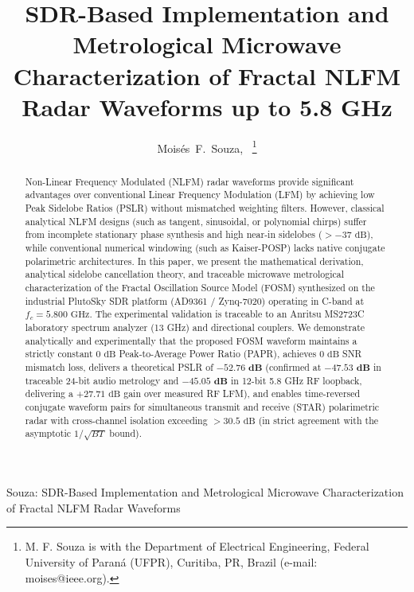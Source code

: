 \documentclass[journal,compsoc]{IEEEtran}
\begin{document}
\title{SDR-Based Implementation and Metrological Microwave Characterization of Fractal NLFM Radar Waveforms up to 5.8 GHz}

\author{Mois\'es~F.~Souza,~%
\thanks{M. F. Souza is with the Department of Electrical Engineering, Federal University of Paran\'a (UFPR), Curitiba, PR, Brazil (e-mail: moises@ieee.org).}}

%
{Souza: SDR-Based Implementation and Metrological Microwave Characterization of Fractal NLFM Radar Waveforms}

\maketitle

\begin{abstract}
Non-Linear Frequency Modulated (NLFM) radar waveforms provide significant advantages over conventional Linear Frequency Modulation (LFM) by achieving low Peak Sidelobe Ratios (PSLR) without mismatched weighting filters. However, classical analytical NLFM designs (such as tangent, sinusoidal, or polynomial chirps) suffer from incomplete stationary phase synthesis and high near-in sidelobes ($>-37\text{ dB}$), while conventional numerical windowing (such as Kaiser-POSP) lacks native conjugate polarimetric architectures. In this paper, we present the mathematical derivation, analytical sidelobe cancellation theory, and traceable microwave metrological characterization of the Fractal Oscillation Source Model (FOSM) synthesized on the industrial PlutoSky SDR platform (AD9361 / Zynq-7020) operating in C-band at $f_c = 5.800\text{ GHz}$. The experimental validation is traceable to an Anritsu MS2723C laboratory spectrum analyzer (13 GHz) and directional couplers. We demonstrate analytically and experimentally that the proposed FOSM waveform maintains a strictly constant $0\text{ dB}$ Peak-to-Average Power Ratio (PAPR), achieves $0\text{ dB}$ SNR mismatch loss, delivers a theoretical PSLR of $\mathbf{-52.76\text{ dB}}$ (confirmed at $\mathbf{-47.53\text{ dB}}$ in traceable 24-bit audio metrology and $\mathbf{-45.05\text{ dB}}$ in 12-bit 5.8 GHz RF loopback, delivering a $+27.71\text{ dB}$ gain over measured RF LFM), and enables time-reversed conjugate waveform pairs for simultaneous transmit and receive (STAR) polarimetric radar with cross-channel isolation exceeding $>30.5\text{ dB}$ (in strict agreement with the asymptotic $1/\sqrt{BT}$ bound).
\end{abstract}
\end{document}
